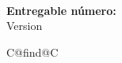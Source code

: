 \begin{center}
  \begin{spacing}{2.5}
    \textbf{\Huge \DelTitle}\\\vspace{10mm}
    \textbf{\Large Entregable número: \DelNumber} \\\vspace{10mm}
    {\large Version \DelVersion}
  \end{spacing}

  \vspace*{\fill}

  \newcommand\undefcolumntype[1]{\expandafter\let\csname NC@find@#1\endcsname\relax}
  \newcommand\forcenewcolumntype[1]{\undefcolumntype{#1}\newcolumntype{#1}}
  \forcenewcolumntype{C}{ >{\arraybackslash} m{3cm} }


\end{center}

\clearpage

\setlength{\headheight}{1cm}
\setlength{\footskip}{18mm}
\addtolength{\textheight}{-\footskip}
\pagestyle{empty}

